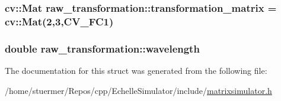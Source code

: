 \subsubsection[{\texorpdfstring{transformation\+\_\+matrix}{transformation_matrix}}]{\setlength{\rightskip}{0pt plus 5cm}cv\+::\+Mat raw\+\_\+transformation\+::transformation\+\_\+matrix = cv\+::\+Mat(2,3,C\+V\+\_\+F\+C1)}\hypertarget{structraw__transformation_a664c5ba015a8d2c1cbd10a3787a306f3}{}\label{structraw__transformation_a664c5ba015a8d2c1cbd10a3787a306f3}
\subsubsection[{\texorpdfstring{wavelength}{wavelength}}]{\setlength{\rightskip}{0pt plus 5cm}double raw\+\_\+transformation\+::wavelength}\hypertarget{structraw__transformation_a8cfb4c9736421e670f53d8eebb4d82ef}{}\label{structraw__transformation_a8cfb4c9736421e670f53d8eebb4d82ef}


The documentation for this struct was generated from the following file\+:\begin{DoxyCompactItemize}
\item 
/home/stuermer/\+Repos/cpp/\+Echelle\+Simulator/include/\hyperlink{matrixsimulator_8h}{matrixsimulator.\+h}\end{DoxyCompactItemize}
